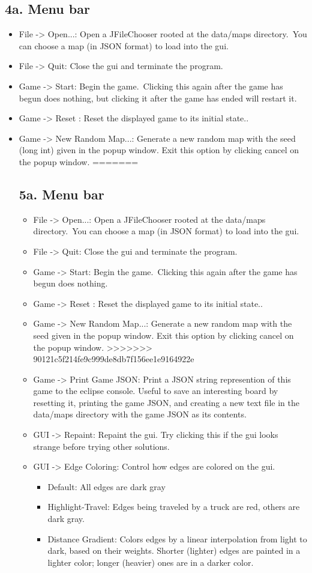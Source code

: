 \documentclass[11pt]{article}
\begin{document}
\subsection{4a. Menu bar}
\begin{itemize}
\item File -> Open...: Open a JFileChooser rooted at the data/maps directory.\ You can choose a map (in JSON format) to load into the gui.
\item File -> Quit:  Close the gui and terminate the program.
\item Game -> Start: Begin the game.\ Clicking this again after the game has begun does nothing, but clicking it after the game has ended will restart it.
\item Game -> Reset : Reset the displayed game to its initial state..
\item Game -> New Random Map...: Generate a new random map with the seed (long int) given in the popup window. Exit this option by clicking cancel on the popup window.
=======
\subsection{5a. Menu bar}
\begin{itemize}
\item File -> Open...: Open a JFileChooser rooted at the data/maps directory.\ You can choose a map (in JSON format) to load into the gui.
\item File -> Quit:  Close the gui and terminate the program.
\item Game -> Start: Begin the game.\ Clicking this again after the game has begun does nothing.
\item Game -> Reset : Reset the displayed game to its initial state..
\item Game -> New Random Map...: Generate a new random map with the seed given in the popup window. Exit this option by clicking cancel on the popup window.
>>>>>>> 90121c5f214fe9c999de8db7f156ee1e9164922e
\item Game -> Print Game JSON: Print a JSON string represention of this game to the eclipse console. Useful to save an interesting board by resetting it, printing the game JSON, and creating a new text file in the data/maps directory with the game JSON as its contents.
\item GUI -> Repaint: Repaint the gui. Try clicking this if the gui looks strange before trying other solutions.
\item GUI -> Edge Coloring: Control how edges are colored on the gui.
\begin{itemize}
\item Default: All edges are dark gray
\item Highlight-Travel: Edges being traveled by a truck are red, others are dark gray.
\item Distance Gradient: Colors edges by a linear interpolation from light to dark, based on their weights. Shorter (lighter) edges are painted in a lighter color; longer (heavier) ones are in a  darker color.
\end{itemize}
\end{itemize}


\end{itemize}
\end{document}
